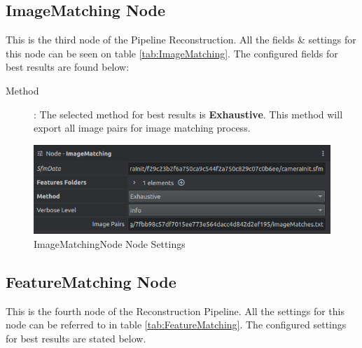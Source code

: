 \documentclass[12pt]{report}
\begin{document}
\subsection*{ImageMatching Node}
This is the third node of the Pipeline Reconstruction. All the fields \& settings for this node can be seen on table \ref{tab:ImageMatching}.
The configured fields for best results are found below: 

\begin{description}
  \item[Method]: The selected method for best results is \textbf{Exhaustive}. This method will export all image pairs for image matching process.  
\end{description}

\begin{figure}[H]%
  \centering
 \includegraphics[width=1\textwidth]{ImageMatchingNode.png}
\caption{ImageMatchingNode Node Settings}
\label{fig:ImageMatchingNode._node} 
\end{figure}



\subsection*{FeatureMatching Node}
This is the fourth node of the Reconstruction Pipeline. All the settings for this node can be referred to in table \ref{tab:FeatureMatching}.
The configured settings for best results are stated below. 
\end{document}
